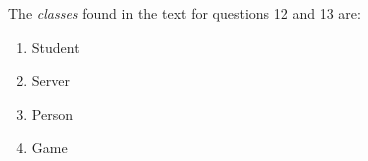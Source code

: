 The \emph{classes} found in the text for questions 12 and 13 are:
\begin{enumerate}
	\item Student
	\item Server
	\item Person
	\item Game
\end{enumerate}
